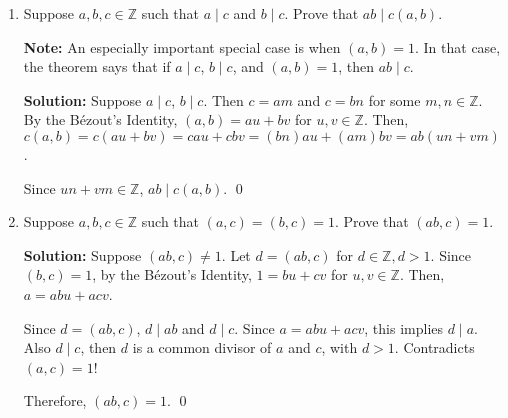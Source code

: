 \documentclass[12pt,reqno]{article}
\newcommand{\Z}{\mathbb{Z}}
\begin{document}
\begin{enumerate}
\textbf{Note:} This means that if we have an efficient algorithm to compute the gcd of two integers, then we can efficiently compute the gcd of three integers by using the algorithm twice. In fact, there is such an algorithm, as we'll see later.

\textbf{Proof: }Let $d=((a,b),c)$ and $k=(a,b)$ for $d,k\in\Z$ and $d,k>0$. Then $d \mid k$. Also, since $k=(a,b)$, $k \mid a$ and $k\mid b$, which implies $d\mid a$ and $d\mid b$. Hence $d$ is a common divisor of $a,b$ and $c$.

Need to prove $d$ is the greatest.

Let $t\in\Z,t>0$ be an arbitrary common divisor of $a,b$ and $c$. Hence, $t\leq k=(a,b)$. By the B\'ezout's Identity, $k=au+bv$ for $u,v\in\Z$. Since $t\mid a$ and $t\mid b$, $t\mid k$. Now $t\mid k$ and $t\mid c$, this implies $t$ is a common divisor of $(a,b)$ and $c$. Hence $t\leq d$. which proves $d=(a,b,c)$.

Therefore, $((a,b),c)=(a,b,c)$.\qed

\item Suppose $a,b,c\in\Z$ such that $a \mid c$ and $b \mid c$. Prove that $ab \mid c(a,b)$.

\textbf{Note:} An especially important special case is when $(a,b)=1$. In that case, the theorem says that if $a \mid c$, $b \mid c$, and $(a, b)=1$, then $ab \mid c$.

\textbf{Solution: }Suppose $a \mid c$, $b \mid c$. Then $c=am$ and $c=bn$ for some $m,n\in\Z$. By the B\'ezout's Identity, $(a,b) = au+bv$ for $u,v\in\Z$. Then, 
$c(a,b)=c(au+bv)=cau+cbv=(bn)au + (am)bv=ab(un+vm)$.

Since $un+vm\in\Z$, $ab \mid c(a,b)$. \qed

\item Suppose $a,b,c\in\Z$ such that $(a,c)=(b,c)=1$. Prove that $(ab,c)=1$.

\textbf{Solution: }Suppose $(ab,c)\neq1$. Let $d=(ab,c)$ for $d\in\Z, d>1$. Since $(b,c)=1$, by the B\'ezout's Identity, $1= bu+cv$ for $u,v\in\Z$. Then, $a=abu+acv$. 

Since $d=(ab,c)$, $d\mid ab$ and $d\mid c$. Since $a=abu+acv$, this implies $d\mid a$. Also $d\mid c$, then $d$ is a common divisor of $a$ and $c$, with $d>1$. Contradicts $(a,c)=1$!

Therefore, $(ab,c)=1$. \qed


\end{enumerate}
\end{document}
